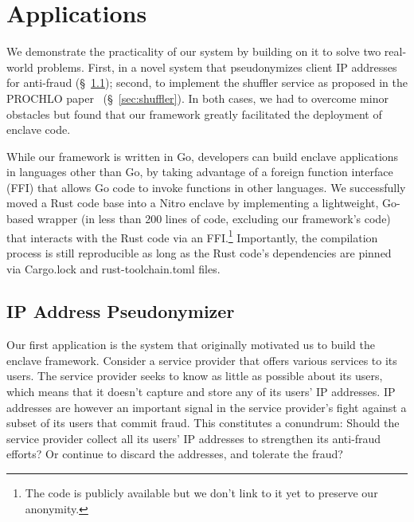 \section{Applications}
\label{sec:applications}

We demonstrate the practicality of our system by building on it to solve two
real-world problems.  First, in a novel system that pseudonymizes client IP
addresses for anti-fraud (\S~\ref{sec:pseudonymization}); second, to implement
the shuffler service as proposed in the PROCHLO paper~\cite{Bittau2017a}
(\S~\ref{sec:shuffler}).  In both cases, we had to overcome minor obstacles but
found that our framework greatly facilitated the deployment of enclave code.

While our framework is written in Go, developers can build enclave applications
in languages other than Go, by taking advantage of a foreign function interface
(FFI) that allows Go code to invoke functions in other languages.  We
successfully moved a Rust code base into a Nitro enclave by implementing a
lightweight, Go-based wrapper (in less than 200 lines of code, excluding our
framework's code) that interacts with the Rust code via an FFI.\footnote{The
code is publicly available but we don't link to it yet to preserve our
anonymity.} Importantly, the compilation process is still reproducible as long
as the Rust code's dependencies are pinned via Cargo.lock and rust-toolchain.toml files.

\subsection{IP Address Pseudonymizer}
\label{sec:pseudonymization}

Our first application is the system that originally motivated us to build the
enclave framework. Consider a service provider that offers various services to
its users.  The service provider seeks to know as little as possible about its
users, which means that it doesn't capture and store any of its users' IP
addresses.  IP addresses are however an important signal in the service
provider's fight against a subset of its users that commit fraud.  This
constitutes a conundrum: Should the service provider collect all its users' IP
addresses to strengthen its anti-fraud efforts?  Or continue to discard the
addresses, and tolerate the fraud?


